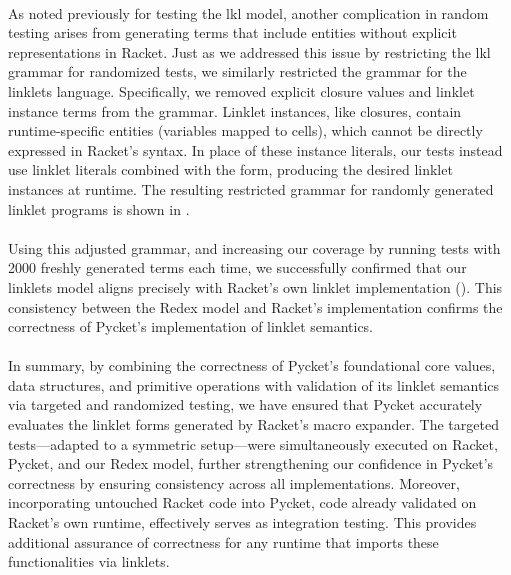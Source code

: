			\paragraph{}%
				As noted previously for testing the \gls{lkl} model, another complication in random testing arises from generating terms that include entities without explicit representations in Racket. Just as we addressed this issue by restricting the \gls{lkl} grammar for randomized tests, we similarly restricted the grammar for the linklets language. Specifically, we removed explicit closure values and linklet instance terms from the grammar. Linklet instances, like closures, contain runtime-specific entities (variables mapped to cells), which cannot be directly expressed in Racket's syntax. In place of these instance literals, our tests instead use linklet literals combined with the  form, producing the desired linklet instances at runtime. The resulting restricted grammar for randomly generated linklet programs is shown in .


			\paragraph{}%
				Using this adjusted grammar, and increasing our coverage by running tests with 2000 freshly generated terms each time, we successfully confirmed that our linklets model aligns precisely with Racket's own linklet implementation (). This consistency between the Redex model and Racket’s implementation confirms the correctness of Pycket’s implementation of linklet semantics.

			\paragraph{}%
				In summary, by combining the correctness of Pycket's foundational core values, data structures, and primitive operations with validation of its linklet semantics via targeted and randomized testing, we have ensured that Pycket accurately evaluates the linklet forms generated by Racket’s macro expander. The targeted tests—adapted to a symmetric setup—were simultaneously executed on Racket, Pycket, and our Redex model, further strengthening our confidence in Pycket's correctness by ensuring consistency across all implementations. Moreover, incorporating untouched Racket code into Pycket, code already validated on Racket’s own runtime, effectively serves as integration testing. This provides additional assurance of correctness for any runtime that imports these functionalities via linklets.

